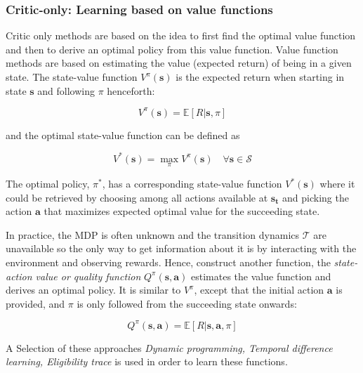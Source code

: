 \subsubsection{Critic-only: Learning based on value functions}
Critic only methods are based on the idea to first find the optimal value function and then to
derive an optimal policy from this value function. 
Value function methods are based on estimating the value (expected return) of being in a given state.
The state-value function $V^{\pi}(\mathbf{s})$ is the expected return when starting in state $\mathbf{s}$ and following $\pi$ henceforth:
\begin{center}
		\begin{equation}
				V^{\pi}(\mathbf{s})=\mathbb{E}[R | \mathbf{s}, \pi]
		\end{equation}
\end{center}

and the optimal state-value function can be defined as
\begin{center}
		\begin{equation}
				V^{*}(\mathbf{s})=\max _{\pi} V^{\pi}(\mathbf{s}) \quad \forall \mathbf{s} \in \mathcal{S}
		\end{equation}
\end{center}

The optimal policy, $\pi^{*}$, has a corresponding state-value function $V^{*}(\mathbf{s})$ where it could be retrieved by choosing among all actions available at $\mathbf{s_t}$ and picking the action $\mathbf{a}$ that maximizes expected optimal value for the succeeding state.

In practice, the MDP is often unknown and the transition dynamics $\mathcal{T}$ are unavailable so the only way to get information about it is by interacting with the environment and observing rewards.
Hence, construct another function, the \textit{state-action value or quality function} $Q^{\pi}(\mathbf{s}, \mathbf{a})$ estimates the value function and derives an optimal policy. 
It is similar to $V^{\pi}$, except that the initial action $\mathbf{a}$ is provided, and $\pi$ is only followed from the succeeding state onwards:
\begin{center}
		\begin{equation}
				Q^{\pi}(\mathbf{s}, \mathbf{a})=\mathbb{E}[R | \mathbf{s}, \mathbf{a}, \pi]
		\end{equation}
\end{center}

A Selection of these approaches \textit{Dynamic programming, Temporal difference learning, 
Eligibility trace} is used in order to learn these functions.

